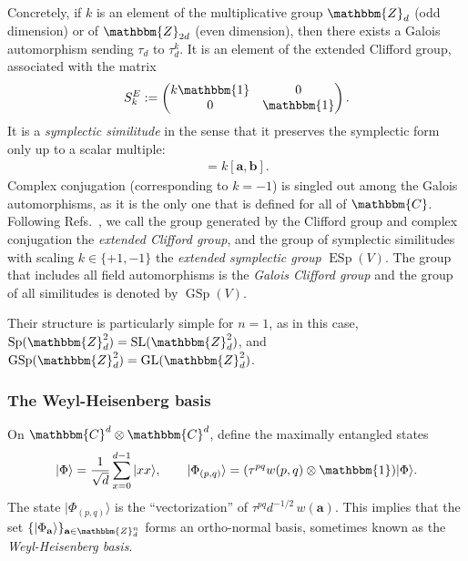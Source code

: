 \documentclass[aps,nofootinbib,floatfix,a4paper]{revtex4}
\newcommand{\1}{\mbox{$\mathbf{1}$}}
\def\ZZ{\mathbbm{Z}}
\def\CC{\mathbbm{C}}
\def\Id{\mathbbm{1}}
\DeclareMathOperator{\Sp}{Sp}
\DeclareMathOperator{\GSp}{GSp}
\DeclareMathOperator{\ESp}{ESp}
\DeclareMathOperator{\GL}{GL}
\renewcommand{\vec}{\mathbf}
\begin{document}
Concretely, if $k$ is an element of the multiplicative group $\ZZ_{d}$ (odd dimension)
or of $\ZZ_{2d}$ (even dimension), 
then there exists a Galois automorphism sending $\tau_d$ to $\tau_d^k$.
It is an element of the extended Clifford group, associated with the matrix
\begin{align*}
	S_k^E
	:=
	\begin{pmatrix}
		k\Id  & 0 \\
		0 & \Id
	\end{pmatrix}.
\end{align*}
It is a \emph{symplectic similitude} in the sense that it preserves the symplectic form only up to a scalar multiple:
\begin{align*}
	[S_k^E \vec a, S_k^E \vec b]
	=
	k [\vec a, \vec b].
\end{align*}
Complex conjugation (corresponding to $k=-1$) is singled out among the Galois automorphisms, as it is the only one that is defined for all of $\CC$.
Following Refs.~\cite{Appleby2015GaloisUM,appleby2009properties}, 
we call the group generated by the Clifford group and complex conjugation the \emph{extended Clifford group}, and the group of symplectic similitudes with scaling $k\in \{+1, -1\}$ the \emph{extended symplectic group} $\ESp(V)$.
The group that includes all field automorphisms is the \emph{Galois Clifford group} and the group of all similitudes is denoted by $\GSp(V)$.

Their structure is particularly simple for $n=1$, as in this case, $\Sp(\ZZ_d^{2})=\operatorname{SL}(\ZZ_d^2)$, and $\GSp(\ZZ_d^2)=\GL(\ZZ_d^2)$.

\subsubsection{The Weyl-Heisenberg basis}
\label{sec:wh_basis}

On $\CC^d\otimes \CC^d$, define the maximally entangled states
\begin{align}\label{eqn:whbasis}
	|\Phi\rangle 
	= \frac1{\sqrt d} \sum_{x=0} ^{d-1} |xx\rangle,
	\qquad
	|\Phi_{(p,q)}\rangle
	=
	(\tau^{pq} w(p,q)\otimes\Id)|\Phi\rangle.
\end{align}
The state $|\Phi_{(p,q)}\rangle$ is the ``vectorization'' of $\tau^{pq}d^{-1/2} \, w(\vec a)$. 
This implies that the set $\{ |\Phi_{\vec a} \rangle \}_{\vec a \in \ZZ_d^n}$ forms an ortho-normal basis, sometimes known as the \emph{Weyl-Heisenberg basis}.
\end{document}
